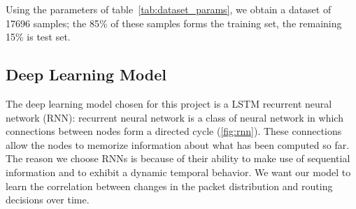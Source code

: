 \begin{table}[h]
\caption{Dataset generation parameters}
\label{tab:dataset_params}
\end{table}
Using the parameters of table~\ref{tab:dataset_params}, we obtain a dataset of 17696 samples; the 85\% of these samples forms the training set, the remaining 15\% is test set. 

\subsection{Deep Learning Model}
\label{sec:dl_model}
The deep learning model chosen for this project is a LSTM recurrent neural network (RNN): recurrent neural network is a class of neural network in which connections between nodes form a directed cycle (\ref{fig:rnn}). These connections allow the nodes to memorize information about what has been computed so far. The reason we choose RNNs is because of their ability to make use of sequential information and to exhibit a dynamic temporal behavior. We want our model to learn the correlation between changes in the packet distribution and routing decisions over time.

